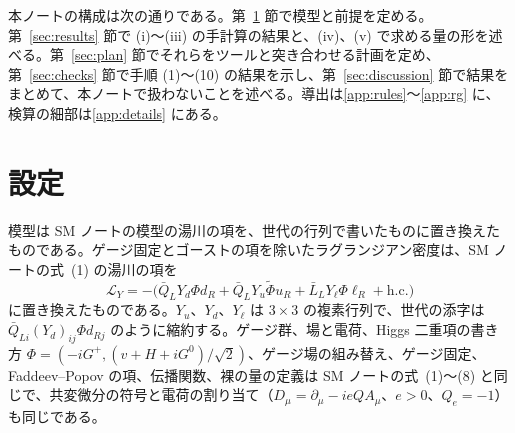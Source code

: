 \documentclass[a4paper,10pt]{ltjsarticle}
\begin{document}
本ノートの構成は次の通りである。第~\ref{sec:setup} 節で模型と前提を定める。第~\ref{sec:results} 節で (i)〜(iii) の手計算の結果と、(iv)、(v) で求める量の形を述べる。第~\ref{sec:plan} 節でそれらをツールと突き合わせる計画を定め、第~\ref{sec:checks} 節で手順 (1)〜(10) の結果を示し、第~\ref{sec:discussion} 節で結果をまとめて、本ノートで扱わないことを述べる。導出は\ref{app:rules}〜\ref{app:rg} に、検算の細部は\ref{app:details} にある。

\section{設定}\label{sec:setup}

模型は SM ノートの模型の湯川の項を、世代の行列で書いたものに置き換えたものである。ゲージ固定とゴーストの項を除いたラグランジアン密度は、SM ノートの式~(1) の湯川の項を
\begin{equation}
\mathcal L_Y=-\bigl(\bar Q_LY_d\Phi d_R+\bar Q_LY_u\tilde\Phi u_R+\bar L_LY_\ell\Phi\ell_R+\mathrm{h.c.}\bigr)
\label{eq:Y}
\end{equation}
に置き換えたものである。$Y_u$、$Y_d$、$Y_\ell$ は $3\times3$ の複素行列で、世代の添字は $\bar Q_{Li}(Y_d)_{ij}\Phi d_{Rj}$ のように縮約する。ゲージ群、場と電荷、Higgs 二重項の書き方 $\Phi=(-iG^+,(v+H+iG^0)/\sqrt2)$、ゲージ場の組み替え、ゲージ固定、Faddeev--Popov の項、伝播関数、裸の量の定義は SM ノートの式~(1)〜(8) と同じで、共変微分の符号と電荷の割り当て（$D_\mu=\partial_\mu-ieQA_\mu$、$e>0$、$Q_e=-1$）も同じである。
\end{document}

